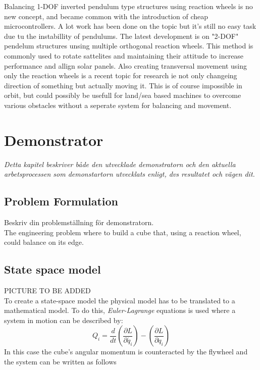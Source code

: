 \documentclass[a4paper,11pt]{kth-mag}
\begin{document}
Balancing 1-DOF inverted pendulum type structures using reaction wheels is no new concept, and became common with the introduction of cheap microcontrollers. A lot work has been done on the topic but it's still no easy task due tu the instabillity of pendulums. The latest development is on "2-DOF" pendelum structures unsing multiple orthogonal reaction wheels. This method is commonly used to rotate sattelites and maintaining their attitude to increase performance and allign solar panels. 
Also creating transversal movement using only the reaction wheels is a recent topic for research ie not only changeing direction of something but actually moving it. This is of course impossible in orbit, but could possibly be usefull for land/sea based machines to overcome various obstacles without a seperate system for balancing and movement.
 
\chapter{Demonstrator}
\emph{Detta kapitel beskriver både den utvecklade demonstratorn och den aktuella arbetsprocessen som demonstartorn utvecklats enligt, dvs resultatet och vägen dit.}


\section{Problem Formulation}
Beskriv din problemställning för demonstratorn.\\

The engineering problem where to build a cube that, using a reaction wheel, could balance on its edge.

\section{State space model}
PICTURE TO BE ADDED
\\
To create a state-space model the physical model has to be translated to a mathematical model. To do this, \emph{Euler-Lagrange} equations is used where a system in motion can be described by:
\begin{equation}
Q_i=\frac{d}{dt}\left(\frac{\partial L}{\partial \dot{q_i}}\right)-\left(\frac{\partial L}{\partial q_i}\right)
\end{equation}
In this case the cube's angular momentum is counteracted by the flywheel and the system can be written as follows
\end{document}
